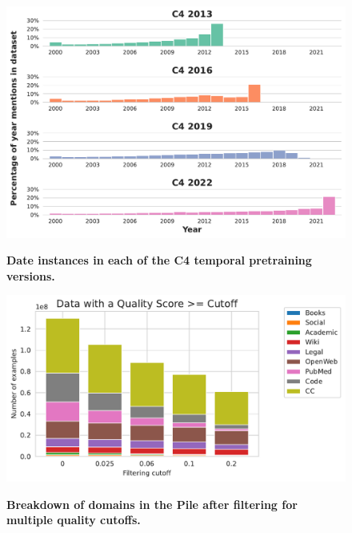 \documentclass{article}
\begin{document}
\begin{figure}[ht]
\begin{minipage}{0.48\columnwidth}
    \centering
    \includegraphics[width=\columnwidth]{fables/KYD/dates-histogram.pdf}
    \caption{
    \small
    \textbf{Date instances in each of the C4 temporal pretraining versions.}}
    \vspace{-3mm}
    \label{fig:dates-histogram}
\end{minipage}
\hfill
\begin{minipage}{0.48\columnwidth}
    \vskip 1.4cm
    \centering
    \includegraphics[width=\columnwidth]{fables/KYD/Data_with_a_Quality_Cutoff.pdf}
    \caption{
    \small
    \textbf{Breakdown of domains in the Pile after filtering for multiple quality cutoffs.}\\
    }
    \vspace{-3mm}
    \label{fig:domains_quality_counts}
\end{minipage}
\end{figure}
\end{document}
